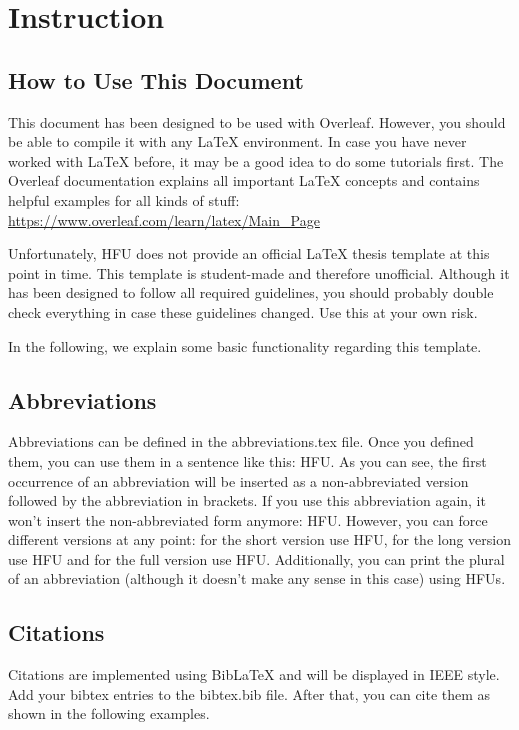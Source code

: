 \chapter{Instruction}

\section{How to Use This Document}
This document has been designed to be used with Overleaf. However, you should be able to compile it with any LaTeX environment. In case you have never worked with LaTeX before, it may be a good idea to do some tutorials first. The Overleaf documentation explains all important LaTeX concepts and contains helpful examples for all kinds of stuff: \url{https://www.overleaf.com/learn/latex/Main_Page}\par

Unfortunately, \acl{HFU} does not provide an official LaTeX thesis template at this point in time. This template is student-made and therefore unofficial. Although it has been designed to follow all required guidelines, you should probably double check everything in case these guidelines changed. Use this at your own risk.\par

In the following, we explain some basic functionality regarding this template.

\section{Abbreviations}
Abbreviations can be defined in the abbreviations.tex file. Once you defined them, you can use them in a sentence like this: \ac{HFU}. As you can see, the first occurrence of an abbreviation will be inserted as a non-abbreviated version followed by the abbreviation in brackets. If you use this abbreviation again, it won't insert the non-abbreviated form anymore: \ac{HFU}. However, you can force different versions at any point: for the short version use \acs{HFU}, for the long version use \acl{HFU} and for the full version use \acf{HFU}. Additionally, you can print the plural of an abbreviation (although it doesn't make any sense in this case) using \acsp{HFU}. 

\section{Citations}
Citations are implemented using BibLaTeX and will be displayed in IEEE style. Add your bibtex entries to the bibtex.bib file. After that, you can cite them as shown in the following examples.

